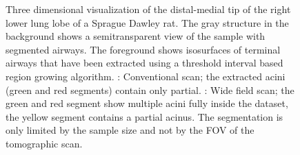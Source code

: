 \begin{figure}[htp]
{%
	}%
	\caption{Three dimensional visualization of the distal-medial tip of the right lower lung lobe of a Sprague Dawley rat. The gray structure in the background shows a semitransparent view of the sample with segmented airways. The foreground shows isosurfaces of terminal airways that have been extracted using a threshold interval based region growing algorithm. : Conventional scan; the extracted acini (green and red segments) contain only partial. : Wide field scan; the green and red segment show multiple acini fully inside the dataset, the yellow segment contains a partial acinus. The segmentation is only limited by the sample size and not by the FOV of the tomographic scan.}%
	\label{fig:FOV increase overview}%
\end{figure}


